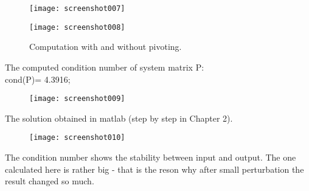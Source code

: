 \documentclass[eng,openany]{mgr}
\begin{document}
\begin{figure}[h]
\centering
\texttt{[image: screenshot007]}
\label{fig:screenshot007}
\end{figure}

\begin{figure}[h]
\centering
\texttt{[image: screenshot008]}
\caption{Computation with and without pivoting.}
\label{fig:screenshot008}
\end{figure}
The computed condition number of system matrix P:\\
cond(P)= 4.3916;
\newpage

\begin{figure}[h]
\centering
\texttt{[image: screenshot009]}
\label{fig:screenshot009}
\end{figure}

The solution obtained in matlab (step by step in Chapter 2).
\begin{figure}[h]
\centering
\texttt{[image: screenshot010]}
\label{fig:screenshot010}
\end{figure}

The condition number shows the stability between input and output. The one calculated here is rather big - that is the reson why after small perturbation the result changed so much.
\end{document}
